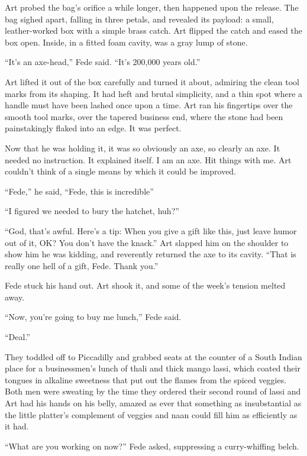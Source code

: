 Art probed the bag’s orifice a while longer, then happened upon the
release. The bag sighed apart, falling in three petals, and
revealed its payload: a small, leather-worked box with a simple
brass catch. Art flipped the catch and eased the box open. Inside,
in a fitted foam cavity, was a gray lump of stone.

“It’s an axe-head,” Fede said. “It’s 200,000 years old.”

Art lifted it out of the box carefully and turned it about,
admiring the clean tool marks from its shaping. It had heft and
brutal simplicity, and a thin spot where a handle must have been
lashed once upon a time. Art ran his fingertips over the smooth
tool marks, over the tapered business end, where the stone had been
painstakingly flaked into an edge. It was perfect.

Now that he was holding it, it was so obviously an axe, so clearly
an axe. It needed no instruction. It explained itself. I am an axe.
Hit things with me. Art couldn’t think of a single means by which
it could be improved.

“Fede,” he said, “Fede, this is incredible{\dash}”

“I figured we needed to bury the hatchet, huh?”

“God, that’s awful. Here’s a tip: When you give a gift like this,
just leave humor out of it, OK? You don’t have the knack.” Art
slapped him on the shoulder to show him he was kidding, and
reverently returned the axe to its cavity. “That is really one hell
of a gift, Fede. Thank you.”

Fede stuck his hand out. Art shook it, and some of the week’s
tension melted away.

“Now, you’re going to buy me lunch,” Fede said.

“Deal.”

They toddled off to Piccadilly and grabbed seats at the counter of
a South Indian place for a businessmen’s lunch of thali and thick
mango lassi, which coated their tongues in alkaline sweetness that
put out the flames from the spiced veggies. Both men were sweating
by the time they ordered their second round of lassi and Art had
his hands on his belly, amazed as ever that something as
insubstantial as the little platter’s complement of veggies and
naan could fill him as efficiently as it had.

“What are you working on now?” Fede asked, suppressing a
curry-whiffing belch.

